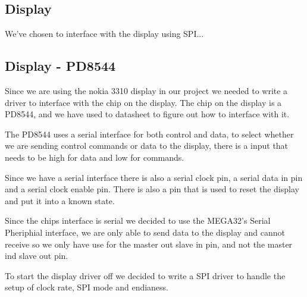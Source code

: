 \subsection{Display}
We've chosen to interface with the display using SPI...

\subsection{Display - PD8544}

Since we are using the nokia 3310 display in our project we needed to write a driver to interface with the chip on the display.
The chip on the display is a PD8544, and we have used to datasheet to figure out how to interface with it. 

The PD8544 uses a serial interface for both control and data, to select whether we are sending control commands or data to the display,
there is a input that needs to be high for data and low for commands.

Since we have a serial interface there is also a serial clock pin, a serial data in pin and a serial clock enable pin.
There is also a pin that is used to reset the display and put it into a known state.

Since the chips interface is serial we decided to use the MEGA32's Serial Pheriphial interface, we are only able to send data to the display 
and cannot receive so we only have use for the master out slave in pin, and not the master ind slave out pin. 

To start the display driver off we decided to write a SPI driver to handle the setup of clock rate, SPI mode and endianess.
